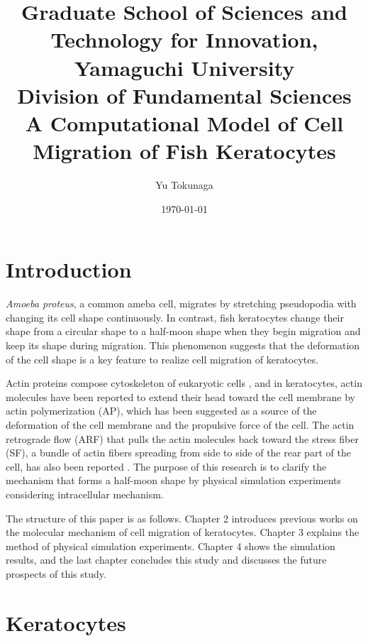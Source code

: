 \documentclass[a4paper,12pt, oneside]{book}
\title{\Large Graduate School of Sciences and Technology for Innovation, Yamaguchi University\\[1cm]
Division of Fundamental Sciences\\[3cm]
\huge A Computational Model of Cell Migration of Fish Keratocytes\\[5cm]
}
\author{Yu Tokunaga}
\date{\Large \today}
\begin{document}
\maketitle
\setcounter{page}{1}
\tableofcontents
\chapter{Introduction}
\setcounter{page}{1}
{\it Amoeba proteus},  a common ameba cell, migrates by stretching pseudopodia with changing its cell shape continuously.
In contrast, fish keratocytes change their shape from a circular shape to a half-moon shape when they begin migration and keep its shape during migration.
This phenomenon suggests that the deformation of the cell shape is a key feature to realize cell migration of keratocytes.

Actin proteins compose cytoskeleton of eukaryotic cells \cite{svitkina1997analysis}, and in keratocytes, actin molecules have been reported to extend their head toward the cell membrane by actin polymerization (AP), which has been suggested as a source of the deformation of the cell membrane and the propulsive force of the cell.
The actin retrograde flow (ARF) that pulls the actin molecules back toward the stress fiber (SF), a bundle of actin fibers spreading from side to side of the rear part of the cell, has also been reported \cite{nakashima2015molecular}.
The purpose of this research is to clarify the mechanism that forms a half-moon shape by physical simulation experiments considering intracellular mechanism.

The structure of this paper is as follows.
Chapter 2 introduces previous works on the molecular mechanism of cell migration of keratocytes.
Chapter 3 explains the  method of physical simulation experiments.
Chapter 4 shows the simulation results, and the last chapter concludes this study and discusses the future prospects of this study.

\chapter{Keratocytes}
\end{document}
